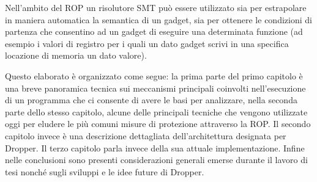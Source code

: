 Nell'ambito del ROP un risolutore SMT può essere utilizzato sia per
estrapolare in maniera automatica la semantica di un gadget, sia per
ottenere le condizioni di partenza che consentino ad un gadget di
eseguire una determinata funzione (ad esempio i valori di registro per
i quali un dato gadget scrivi in una specifica locazione di memoria un
dato valore).

Questo elaborato è organizzato come segue: la prima parte del primo
capitolo è una breve panoramica tecnica sui meccanismi principali
coinvolti nell'esecuzione di un programma che ci consente di avere le
basi per analizzare, nella seconda parte dello stesso capitolo, alcune
delle principali tecniche che vengono utilizzate oggi per eludere le
più comuni misure di protezione attraverso la ROP. Il secondo capitolo
invece è una descrizione dettagliata dell'architettura designata per
Dropper. Il terzo capitolo parla invece della sua attuale
implementazione. Infine nelle conclusioni sono presenti considerazioni
generali emerse durante il lavoro di tesi nonché sugli sviluppi e le
idee future di Dropper.




